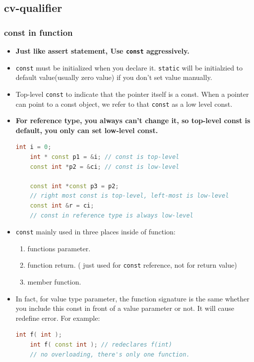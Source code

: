 \documentclass[a4paper,11pt,twoside]{book}
\begin{document}
\subsection{cv-qualifier}
\subsubsection{const in function}
\begin{itemize}
	\item \textbf{Just like assert statement, Use \texttt{const} aggressively.}
	
	\item \texttt{const} must be initialized when you declare it. \texttt{static} will be initialzied to default value(usually zero value) if you don't set value manually. 
	
	\item Top-level \texttt{const} to indicate that the pointer itself is a const. When a pointer can point to a const object, we refer to that \texttt{const} as a low level const.
	
	\item \textbf{For reference type, you always can't change it, so top-level const is default, you only can set low-level const.}
	\begin{lstlisting}[frame=single, language=c++]
	int i = 0;
	int * const p1 = &i; // const is top-level
	const int *p2 = &ci; // const is low-level
	
	const int *const p3 = p2;
	// right most const is top-level, left-most is low-level
	const int &r = ci;
	// const in reference type is always low-level
	\end{lstlisting}
	
	
	\item \texttt{const} mainly used in three places inside of function:
	\begin{enumerate}
		\item functions parameter.
		\item function return. ( just used for \texttt{const} reference, not for return value)
		\item member function.
	\end{enumerate}
	
	\item In fact, for value type parameter, the function signature is the same whether you include this const in front of a value parameter or not. It will cause redefine error. For example:
	\begin{lstlisting}[frame=single, language=c++]
	int f( int );
	int f( const int ); // redeclares f(int)
	// no overloading, there's only one function.
	\end{lstlisting}
	

\end{itemize}
\end{document}
